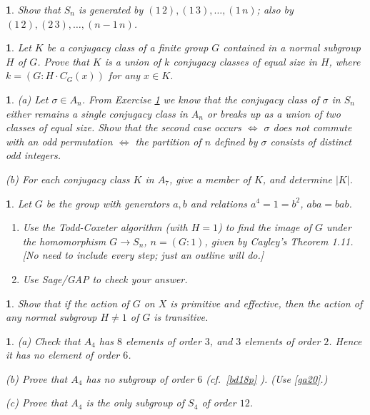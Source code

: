 \documentclass[a4paper,11pt,final]{memoir}%
\newtheorem{exercise}[Y]{}
\theoremstyle{nonumberplain}
\begin{document}
\begin{exercise}
\label{x26} Show that $S_{n}$ is generated by $(1\,2),(1\,3),\ldots,(1\,n)$;
also by $(1\,2),(2\,3),\ldots,(n-1\,n)$.
\end{exercise}

\begin{exercise}
\label{x27} Let $K$ be a conjugacy class of a finite group $G$ contained in a
normal subgroup $H$ of $G$. Prove that $K$ is a union of $k$ conjugacy classes
of equal size in $H$, where $k=(G:H\cdot C_{G}(x))$ for any $x\in K$.

\end{exercise}

\begin{exercise}
\label{x28} (a) Let $\sigma\in A_{n}$. From Exercise \ref{x27} we know that
the conjugacy class of $\sigma$ in $S_{n}$ either remains a single conjugacy
class in $A_{n}$ or breaks up as a union of two classes of equal size. Show
that the second case occurs $\iff$ $\sigma$ does not commute with an odd
permutation $\iff$ the partition of $n$ defined by $\sigma$ consists of
distinct odd integers.

\noindent(b) For each conjugacy class $K$ in $A_{7}$, give a member of $K$,
and determine $|K|$.

\end{exercise}

\begin{exercise}
\label{x29} Let $G$ be the group with generators $a,b$ and relations
$a^{4}=1=b^{2}$, $aba=bab$.

\begin{enumerate}
\item Use the Todd-Coxeter algorithm (with $H=1$) to find the image of $G$
under the homomorphism $G\rightarrow S_{n}$, $n=(G:1)$, given by Cayley's
Theorem 1.11. [No need to include every step; just an outline will do.]

\item Use Sage/GAP to check your answer.
\end{enumerate}
\end{exercise}

\begin{exercise}
\label{x30} Show that if the action of $G$ on $X$ is primitive and effective,
then the action of any normal subgroup $H\neq1$ of $G$ is transitive.
\end{exercise}

\begin{exercise}
\label{x31} (a) Check that $A_{4}$ has $8$ elements of order $3$, and $3$
elements of order $2$. Hence it has no element of order $6$.

\noindent(b) Prove that $A_{4}$ has no subgroup of order $6$ (cf.\ \ref{bd18p}%
). (Use \ref{ga20}.)

\noindent(c) Prove that $A_{4}$ is the only subgroup of $S_{4}$ of order $12$.
\end{exercise}
\end{document}
